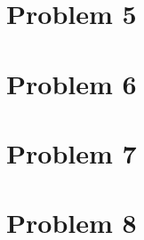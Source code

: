 \documentclass[12pt,a4paper]{article}
\begin{document}
    \section*{Problem 5}
    
    \section*{Problem 6}
    
    \section*{Problem 7}
    
    \section*{Problem 8}
    
\end{document}
